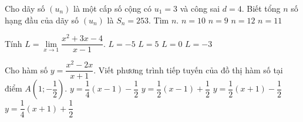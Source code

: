 \begin{ex}%
	Cho dãy số $\left(u_n\right)$ là một cấp số cộng có $u_1 = 3$ và công sai $d = 4$. Biết tổng $n$ số hạng đầu của dãy số $\left(u_n\right)$ là $S_n = 253$. Tìm $n$.
	\choice
	{$n = 10$}
	{$n = 9$}
	{$n = 12$}
	{\True $n = 11$}
\end{ex}


\begin{ex}%
	Tính $L = \lim\limits_{x \to 1} \dfrac{x^2+3x-4}{x-1}$.
	\choice
	{$L =-5$}
	{\True $L = 5$}
	{$L = 0$}
	{$L =-3$}
\end{ex}


\begin{ex}%
	Cho hàm số $y = \dfrac{x^2-2x}{x+1}$. Viết phương trình tiếp tuyến của đồ thị hàm số tại điểm $A\left(1;-\dfrac{1}{2}\right)$.
	\choice
	{\True $y = \dfrac{1}{4}(x-1)-\dfrac{1}{2}$}
	{$y = \dfrac{1}{2}(x-1)+\dfrac{1}{2}$}
	{$y = \dfrac{1}{2}(x+1)-\dfrac{1}{2}$}
	{$y = \dfrac{1}{4}(x+1)+\dfrac{1}{2}$}
\end{ex}


